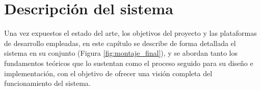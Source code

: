 \chapter{Descripción del sistema}
\label{cap:capitulo5}



Una vez expuestos el estado del arte, los objetivos del proyecto y las plataformas de desarrollo empleadas, en este capítulo se describe de forma detallada el sistema en su conjunto (Figura \ref{fig:montaje_final}), y se abordan tanto los fundamentos teóricos que lo sustentan como el proceso seguido para su diseño e implementación, con el objetivo de ofrecer una visión completa del funcionamiento del sistema.

